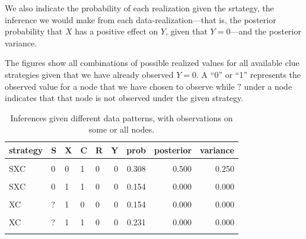 \documentclass[
  12pt,
]{book}
\begin{document}
We also indicate the probability of each realization given the srtategy, the inference we would make from each data-realization---that is, the posterior probability that \(X\) has a positive effect on \(Y\), given that \(Y=0\)---and the posterior variance.

The figures show all combinations of possible realized values for all available clue strategies given that we have already observed \(Y=0\). A ``0'' or ``1'' represents the observed value for a node that we have chosen to observe while \(?\) under a node indicates that that node is not observed under the given strategy.

\begin{table}

\caption{\label{tab:showstrats5xx}Inferences given different data patterns, with observations on some or all nodes.}
\centering
\begin{tabular}[t]{lllllrrrr}
\toprule
strategy & S & X & C & R & Y & prob & posterior & variance\\
\midrule
\cellcolor{gray!6}{SXC} & \cellcolor{gray!6}{1} & \cellcolor{gray!6}{1} & \cellcolor{gray!6}{0} & \cellcolor{gray!6}{0} & \cellcolor{gray!6}{0} & \cellcolor{gray!6}{0.154} & \cellcolor{gray!6}{0.000} & \cellcolor{gray!6}{0.000}\\
SXC & 0 & 0 & 1 & 0 & 0 & 0.308 & 0.500 & 0.250\\
\cellcolor{gray!6}{SXC} & \cellcolor{gray!6}{1} & \cellcolor{gray!6}{0} & \cellcolor{gray!6}{1} & \cellcolor{gray!6}{0} & \cellcolor{gray!6}{0} & \cellcolor{gray!6}{0.308} & \cellcolor{gray!6}{0.250} & \cellcolor{gray!6}{0.188}\\
SXC & 0 & 1 & 1 & 0 & 0 & 0.154 & 0.000 & 0.000\\
\cellcolor{gray!6}{SXC} & \cellcolor{gray!6}{1} & \cellcolor{gray!6}{1} & \cellcolor{gray!6}{1} & \cellcolor{gray!6}{0} & \cellcolor{gray!6}{0} & \cellcolor{gray!6}{0.077} & \cellcolor{gray!6}{0.000} & \cellcolor{gray!6}{0.000}\\
\addlinespace
XC & ? & 1 & 0 & 0 & 0 & 0.154 & 0.000 & 0.000\\
\cellcolor{gray!6}{XC} & \cellcolor{gray!6}{?} & \cellcolor{gray!6}{0} & \cellcolor{gray!6}{1} & \cellcolor{gray!6}{0} & \cellcolor{gray!6}{0} & \cellcolor{gray!6}{0.615} & \cellcolor{gray!6}{0.375} & \cellcolor{gray!6}{0.234}\\
XC & ? & 1 & 1 & 0 & 0 & 0.231 & 0.000 & 0.000\\
\cellcolor{gray!6}{SC} & \cellcolor{gray!6}{1} & \cellcolor{gray!6}{?} & \cellcolor{gray!6}{0} & \cellcolor{gray!6}{0} & \cellcolor{gray!6}{0} & \cellcolor{gray!6}{0.154} & \cellcolor{gray!6}{0.000} & \cellcolor{gray!6}{0.000}\\

\end{tabular}
\end{table}
\end{document}
